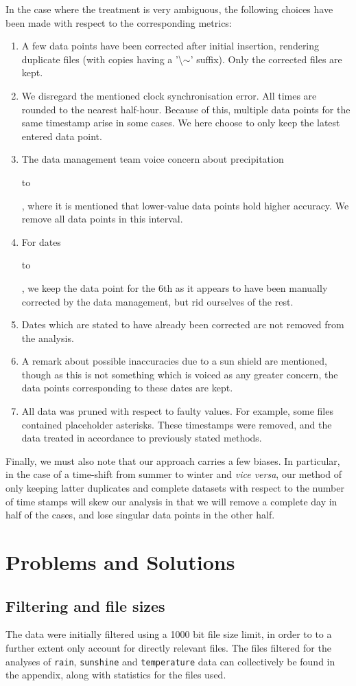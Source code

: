 \documentclass[10pt]{article}\usepackage[]{graphicx}\usepackage[]{color}
\theoremstyle{plain}
\begin{document}
In the case where the treatment is very ambiguous, the following choices have been made with respect to the corresponding metrics:
\begin{enumerate}
  \item A few data points have been corrected after initial insertion, rendering duplicate files (with copies having a '\textbackslash$\sim$' suffix). Only the corrected files are kept.
  \item We disregard the mentioned clock synchronisation error. All times are rounded to the nearest half-hour. Because of this, multiple data points for the same timestamp arise in some cases. We here choose to only keep the latest entered data point.
  \item The data management team voice concern about precipitation \date{2001-06-01} to \date{2001-07-29}, where it is mentioned that lower-value data points hold higher accuracy. We remove all data points in this interval.
  \item For dates \date{2006-10-05} to \date{2006-10-09}, we keep the data point for the 6th as it appears to have been manually corrected by the data management, but rid ourselves of the rest.
  \item Dates which are stated to have already been corrected are not removed from the analysis.
  \item A remark about possible inaccuracies due to a sun shield are mentioned, though as this is not something which is voiced as any greater concern, the data points corresponding to these dates are kept.
  \item All data was pruned with respect to faulty values. For example, some files contained placeholder asterisks. These timestamps were removed, and the data treated in accordance to previously stated methods.
\end{enumerate}

Finally, we must also note that our approach carries a few biases. In particular, in the case of a time-shift from summer to winter and \textit{vice versa}, our method of only keeping latter duplicates and complete datasets with respect to the number of time stamps will skew our analysis in that we will remove a complete day in half of the cases, and lose singular data points in the other half.

\section{Problems and Solutions}
\subsection{Filtering and file sizes}
The data were initially filtered using a 1000 bit file size limit, in order to to a further extent only account for directly relevant files. The files filtered for the analyses of \texttt{rain}, \texttt{sunshine} and \texttt{temperature} data can collectively be found in the appendix, along with statistics for the files used. 
\end{document}
